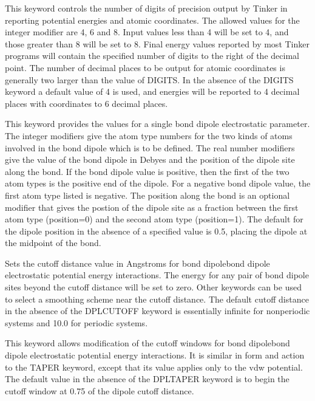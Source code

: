 \documentclass[letterpaper,11pt,english]{sphinxmanual}
\begin{document}
  This keyword controls the number of digits of precision  output by Tinker in reporting potential energies and atomic coordinates. The allowed values for the integer modifier are 4, 6 and 8. Input values less than 4 will be set to 4, and those greater than 8 will be set to 8. Final energy values reported by most Tinker programs will contain the specified number of digits to the right of the decimal point. The number of decimal places to be output for atomic coordinates is generally two larger than the value of DIGITS. In the absence of the DIGITS keyword a default value of 4 is used, and  energies will be reported to 4 decimal places with coordinates to 6 decimal places.


  This keyword provides the values for a single bond dipole electrostatic parameter. The integer modifiers give the atom type numbers for the two kinds of atoms involved in the bond dipole which is to be defined. The real number modifiers give the value of the bond dipole in Debyes and the position of the dipole site along the bond. If the bond dipole value is positive, then the first of the two atom types is the positive end of the dipole. For a negative bond dipole value, the first atom type listed is negative. The position along the bond is an optional modifier that gives the postion of the dipole site as a fraction between the first atom type (position=0) and the second atom type (position=1). The default for the dipole position in the absence of a specified value is 0.5, placing the dipole at the midpoint of the bond.

  Sets the cutoff distance value in Angstroms for bond dipole\sphinxhyphen{}bond dipole electrostatic potential energy interactions. The energy for any pair of bond dipole sites beyond the cutoff distance will be set to zero. Other keywords can be used to select a smoothing scheme near the cutoff distance. The default cutoff distance in the absence of the DPL\sphinxhyphen{}CUTOFF keyword is essentially infinite for nonperiodic systems and 10.0 for periodic systems.

  This keyword allows modification of the cutoff windows for bond dipole\sphinxhyphen{}bond dipole electrostatic potential energy interactions. It is similar in form and action to the TAPER keyword, except that its value applies only to the vdw potential. The default value in the absence of the DPL\sphinxhyphen{}TAPER keyword is to begin the cutoff window at 0.75 of the dipole cutoff distance.
\end{document}
